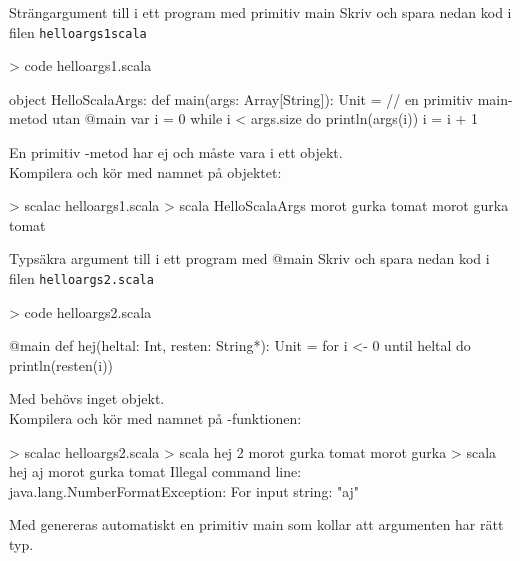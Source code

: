 \begin{Slide}{Strängargument till i ett program med primitiv main}
Skriv och spara nedan kod i filen \texttt{helloargs1scala}
\begin{REPLnonum}
> code helloargs1.scala
\end{REPLnonum}
\begin{Code}
object HelloScalaArgs:
  def main(args: Array[String]): Unit = // en primitiv main-metod utan @main
    var i = 0
    while i < args.size do
      println(args(i))
      i = i + 1
\end{Code}
En primitiv -metod har ej  och måste vara i ett objekt. \\
Kompilera och kör med namnet på objektet:
\begin{REPL}
> scalac helloargs1.scala
> scala HelloScalaArgs morot gurka tomat
morot
gurka
tomat
\end{REPL}
\end{Slide}

\begin{Slide}{Typsäkra argument till i ett program med @main}
  \SlideFontSmall
Skriv och spara nedan kod i filen \texttt{helloargs2.scala}
\begin{REPLnonum}
> code helloargs2.scala
\end{REPLnonum}
\begin{Code}
@main def hej(heltal: Int, resten: String*): Unit = 
  for i <- 0 until heltal do println(resten(i))
\end{Code}
Med  behövs inget objekt.\\
Kompilera och kör med namnet på -funktionen:
\begin{REPL}
> scalac helloargs2.scala
> scala hej 2 morot gurka tomat
morot
gurka
> scala hej aj morot gurka tomat
Illegal command line: java.lang.NumberFormatException: For input string: "aj"
\end{REPL}
Med  genereras automatiskt en primitiv main som kollar att argumenten har rätt typ.
\end{Slide}


